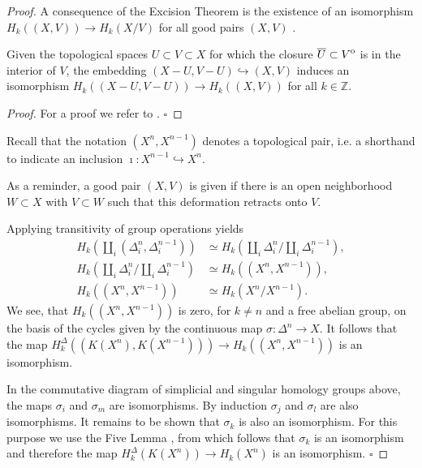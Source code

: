\documentclass[envcountsect,runningheads]{llncs}
\renewcommand{\qed}{\hfill$\square$}
\newcommand{\interior}[1]{%
  {\kern0pt#1}^{\mathrm{o}}%
}
\begin{document}
\begin{proof}
A consequence of the Excision Theorem is the existence of an isomorphism $H_k((X,V)) \rightarrow H_k(X/V)$ for all good pairs $(X,V)$ \cite[pp.~175-182]{munkres2018elements}.

\begin{theorem}
Given the topological spaces $U \subset V \subset X$ for which the closure $\overline{U} \subset \interior{V}$ is in the interior of $V$, the embedding $(X-U,V-U) \hookrightarrow (X,V)$ induces an isomorphism $H_k((X-U, V-U)) \rightarrow H_k((X,V))$ for all $k \in \mathbb{Z}$.
\end{theorem}

\begin{proof}
For a proof we refer to \cite[pp.~175-182]{munkres2018elements}. \qed
\end{proof}

\begin{remarktheo}
Recall that the notation $(X^{n},X^{n-1})$ denotes a topological pair, i.e. a shorthand to indicate an inclusion $\imath: X^{n-1} \hookrightarrow X^n$. 
\end{remarktheo}
\begin{remarktheo}
As a reminder, a good pair $(X,V)$ is given if there is an open neighborhood $W \subset X$ with $V \subset W$ such that this deformation retracts onto $V$. 
\end{remarktheo}

Applying transitivity of group operations yields
\begin{align}
	H_k\left(\coprod_i\left(\Delta^n_i,\Delta^{n-1}_i\right)\right) &\simeq H_k\left(\coprod_i \Delta^n_i/\coprod_i \Delta^{n-1}_i\right),\\
	H_k\left(\coprod_i \Delta^n_i/\coprod_i \Delta^{n-1}_i\right) &\simeq H_k\left(\left(X^n,X^{n-1}\right)\right),\\
	H_k\left(\left(X^n,X^{n-1}\right)\right) &\simeq H_k(X^n / X^{n-1}).
\end{align}
We see, that $H_k((X^n,X^{n-1}))$ is zero, for $k \neq n$ and a free abelian group, on the basis of the cycles given by the continuous map $\sigma: \Delta^n \rightarrow X$. It follows that the map $H^\Delta_k((K(X^n),K(X^{n-1}))) \rightarrow H_k((X^n,X^{n-1}))$ is an isomorphism.

In the commutative diagram of simplicial and singular homology groups above, the maps $\sigma_i$ and $\sigma_m$ are isomorphisms. By induction $\sigma_j$ and $\sigma_l$ are also isomorphisms. It remains to be shown that $\sigma_k$ is also an isomorphism. For this purpose we use the Five Lemma \cite{pryde1977five}, from which follows that $\sigma_k$ is an isomorphism and therefore the map $H^{\Delta}_k(K(X^n)) \rightarrow H_k(X^n)$ is an isomorphism. \qed
\end{proof}
\end{document}
